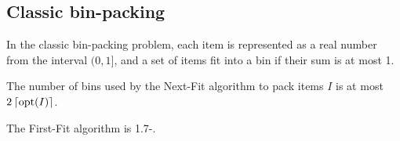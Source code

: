 \subsection{Classic bin-packing}

In the classic bin-packing problem, each item is represented as a real number
from the interval $(0, 1]$, and a set of items fit into a bin if their sum is at most 1.

\begin{theorem}
The number of bins used by the Next-Fit algorithm to pack items $I$ is at most
$2\left\lceil \operatorname*{opt}(I) \right\rceil$.
\end{theorem}

\begin{theorem}
The First-Fit algorithm is 1.7-\asymAppx.
\end{theorem}
